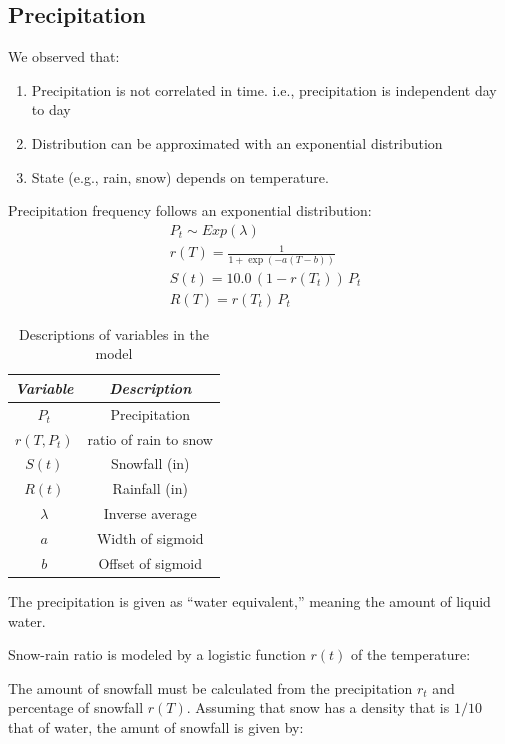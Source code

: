 \documentclass[11pt, letterpaper]{article}
\begin{document}
\subsection{Precipitation}

We observed that:
\begin{enumerate}
\item Precipitation is not correlated in time.  i.e., precipitation is independent day to day
\item Distribution can be approximated with an exponential distribution
\item State (e.g., rain, snow) depends on temperature.
\end{enumerate}

Precipitation frequency follows an exponential distribution:
\begin{align}
&P_t \sim Exp(\lambda) \\
&r(T) = \frac{1}{1 + \exp(-a (T - b))} \\
&S(t) = 10.0 \, (1 - r(T_t)) \, P_t \\
&R(T) = r(T_t) \, P_t
\end{align}

\begin{table}[H]
  \centering
  \begin{tabular}{c c} \hline
  \emph{Variable} & \emph{Description} \\ \hline
  $P_t$ & Precipitation \\ \hline
  $r(T, P_t)$ & ratio of rain to snow \\ \hline
  $S(t)$ & Snowfall (in) \\ \hline
  $R(t)$ & Rainfall (in) \\ \hline
  $\lambda$ & Inverse average \\ \hline
  $a$ & Width of sigmoid \\ \hline
  $b$ & Offset of sigmoid \\ \hline
  \end{tabular}
  \caption{Descriptions of variables in the model}
  \label{tab:analysis-ft-values}
\end{table}

The precipitation is given as ``water equivalent,'' meaning the amount of liquid water.

Snow-rain ratio is modeled by a logistic function $r(t)$ of the temperature:

The amount of snowfall must be calculated from the precipitation $r_t$ and percentage of snowfall $r(T)$.  Assuming that snow has a density that is $1/10$ that of water, the amunt of snowfall is given by:
\end{document}
